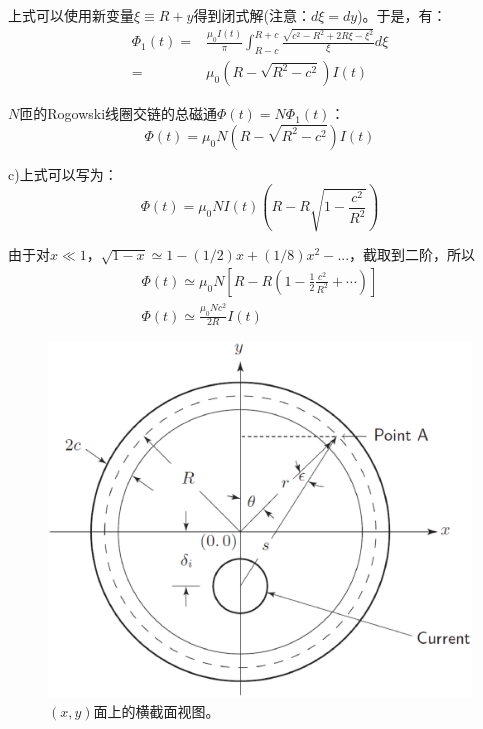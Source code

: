 上式可以使用新变量$\xi\equiv R+y$得到闭式解(注意：$d\xi=dy$)。于是，有：
\begin{align}
\Phi_1 (t)=&\frac{\mu_0 I(t)}{\pi} \int_{R-c}^{R+c}\frac{\sqrt{c^2-R^2+2R\xi-\xi^2}}{\xi}d\xi\nonumber\\
=&\mu_0(R-\sqrt{R^2-c^2})I(t)\nonumber\tag{S9.4}
\end{align}

$N$匝的Rogowski线圈交链的总磁通$\Phi(t)=N\Phi_1(t)$：
\begin{equation*}
\Phi (t)=\mu_0 N(R-\sqrt{R^2-c^2})I(t) \tag{2.70}
\end{equation*}

c)上式可以写为：
\begin{equation*}
\Phi (t)=\mu_0 NI(t)(R-R\sqrt{1-\frac{c^2}{R^2}}) \tag{S9.5}
\end{equation*}

由于对$x\ll 1$，$\sqrt{1-x}\simeq 1-(1/2)x+(1/8)x^2-...$，截取到二阶，所以
\begin{align}
\Phi(t)\simeq\mu_0 N\left[R-R\left(1-\frac{1}{2}\frac{c^2}{R^2}+\cdots\right)\right]\nonumber\tag{S9.6}\\
\Phi (t)\simeq \frac{\mu_0 Nc^2}{2R} I(t)\nonumber\tag{2.69}
\end{align}

\begin{figure}[htbp]
	\centering
	\includegraphics[scale=0.4]{chpt2/figs/fig2.15.eps}
	\caption{$(x,y)$面上的横截面视图。}
\end{figure}


